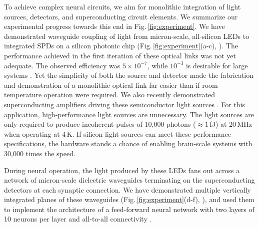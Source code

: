 \documentclass[twocolumn]{article}
\begin{document}
To achieve complex neural circuits, we aim for monolithic integration of light sources, detectors, and superconducting circuit elements. We summarize our experimental progress towards this end in Fig.\,\ref{fig:experiment}. We have demonstrated waveguide coupling of light from micron-scale, all-silicon LEDs to integrated SPDs on a silicon photonic chip (Fig.\,\ref{fig:experiment}(a-c), \cite{buch2017}). The performance achieved in the first iteration of these optical links was not yet adequate. The observed efficiency was $5\times10^{-7}$, while $10^{-3}$ is desirable for large systems \cite{sh2018}. Yet the simplicity of both the source and detector made the fabrication and demonstration of a monolithic optical link far easier than if room-temperature operation were required. We also recently demonstrated superconducting amplifiers driving these semiconductor light sources \cite{mc2019}. For this application, high-performance light sources are unnecessary. The light sources are only required to produce incoherent pulses of 10,000 photons ($\approx 1$\,fJ) at 20\,MHz when operating at 4\,K. If silicon light sources can meet these performance specifications, the hardware stands a chance of enabling brain-scale systems with 30,000 times the speed.

During neural operation, the light produced by these LEDs fans out across a network of micron-scale dielectric waveguides terminating on the superconducting detectors at each synaptic connection. We have demonstrated multiple vertically integrated planes of these waveguides (Fig.\,\ref{fig:experiment}(d-f), \cite{chbu2017}), and used them to implement the architecture of a feed-forward neural network with two layers of 10 neurons per layer and all-to-all connectivity \cite{chbu2018}.
\end{document}
